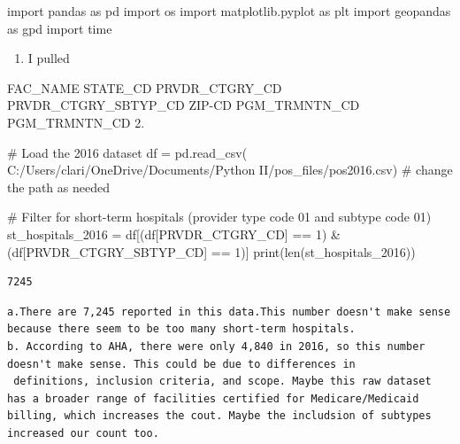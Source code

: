 \documentclass[
  letterpaper,
  DIV=11,
  numbers=noendperiod]{scrartcl}
\newenvironment{Shaded}{\begin{snugshade}}{\end{snugshade}}
\newcommand{\BuiltInTok}[1]{\textcolor[rgb]{0.00,0.23,0.31}{#1}}
\newcommand{\CommentTok}[1]{\textcolor[rgb]{0.37,0.37,0.37}{#1}}
\newcommand{\DecValTok}[1]{\textcolor[rgb]{0.68,0.00,0.00}{#1}}
\newcommand{\ImportTok}[1]{\textcolor[rgb]{0.00,0.46,0.62}{#1}}
\newcommand{\NormalTok}[1]{\textcolor[rgb]{0.00,0.23,0.31}{#1}}
\newcommand{\OperatorTok}[1]{\textcolor[rgb]{0.37,0.37,0.37}{#1}}
\newcommand{\StringTok}[1]{\textcolor[rgb]{0.13,0.47,0.30}{#1}}
\providecommand{\tightlist}{%
  \setlength{\itemsep}{0pt}\setlength{\parskip}{0pt}}\usepackage{longtable,booktabs,array}
\begin{document}
\begin{Shaded}
\begin{Highlighting}[]
\ImportTok{import}\NormalTok{ pandas }\ImportTok{as}\NormalTok{ pd}
\ImportTok{import}\NormalTok{ os}
\ImportTok{import}\NormalTok{ matplotlib.pyplot }\ImportTok{as}\NormalTok{ plt}
\ImportTok{import}\NormalTok{ geopandas }\ImportTok{as}\NormalTok{ gpd}
\ImportTok{import}\NormalTok{ time}
\end{Highlighting}
\end{Shaded}

\begin{enumerate}
\def\labelenumi{\arabic{enumi}.}
\tightlist
\item
  I pulled
\end{enumerate}

FAC\_NAME STATE\_CD PRVDR\_CTGRY\_CD PRVDR\_CTGRY\_SBTYP\_CD ZIP-CD
PGM\_TRMNTN\_CD PGM\_TRMNTN\_CD 2.

\begin{Shaded}
\begin{Highlighting}[]
\CommentTok{\# Load the 2016 dataset}
\NormalTok{df }\OperatorTok{=}\NormalTok{ pd.read\_csv(}
    \StringTok{\textquotesingle{}C:/Users/clari/OneDrive/Documents/Python II/pos\_files/pos2016.csv\textquotesingle{}}\NormalTok{)}
\CommentTok{\# change the path as needed}
\end{Highlighting}
\end{Shaded}

\begin{Shaded}
\begin{Highlighting}[]
\CommentTok{\# Filter for short{-}term hospitals (provider type code 01 and subtype code 01)}
\NormalTok{st\_hospitals\_2016 }\OperatorTok{=}\NormalTok{ df[(df[}\StringTok{\textquotesingle{}PRVDR\_CTGRY\_CD\textquotesingle{}}\NormalTok{] }\OperatorTok{==} \DecValTok{1}\NormalTok{) }\OperatorTok{\&}
\NormalTok{                       (df[}\StringTok{\textquotesingle{}PRVDR\_CTGRY\_SBTYP\_CD\textquotesingle{}}\NormalTok{] }\OperatorTok{==} \DecValTok{1}\NormalTok{)]}
\BuiltInTok{print}\NormalTok{(}\BuiltInTok{len}\NormalTok{(st\_hospitals\_2016))}
\end{Highlighting}
\end{Shaded}

\begin{verbatim}
7245
\end{verbatim}

\begin{verbatim}
a.There are 7,245 reported in this data.This number doesn't make sense because there seem to be too many short-term hospitals.
b. According to AHA, there were only 4,840 in 2016, so this number doesn't make sense. This could be due to differences in
 definitions, inclusion criteria, and scope. Maybe this raw dataset  has a broader range of facilities certified for Medicare/Medicaid billing, which increases the cout. Maybe the includsion of subtypes increased our count too.
\end{verbatim}
\end{document}

